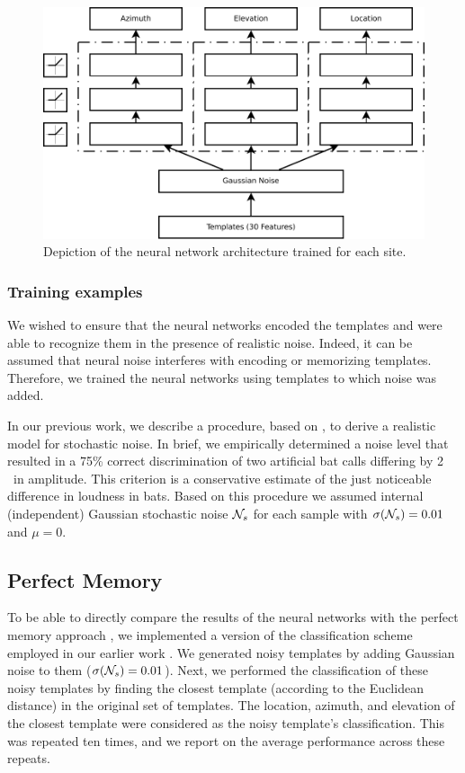 \documentclass[preprint,5p]{elsarticle}
\begin{document}
\begin{figure}
	\centering
	\includegraphics[width=1\linewidth]{figures/networks}
	\caption{Depiction of the neural network architecture trained for each site.}
	\label{fig:networks}
\end{figure}

\subsubsection{Training examples}

We wished to ensure that the neural networks encoded the templates and were able to recognize them in the presence of realistic noise. Indeed, it can be assumed that neural noise interferes with encoding or memorizing templates. Therefore, we trained the neural networks using templates to which noise was added.

In our previous work, we describe a procedure, based on \citet{Dau1996}, to derive a realistic model for stochastic noise. In brief, we empirically determined a noise level that resulted in a 75\% correct discrimination of two artificial bat calls differing by 2 \db\ in amplitude. This criterion is a conservative estimate of the just noticeable difference in loudness in bats. Based on this procedure we assumed internal (independent) Gaussian stochastic noise $\mathcal{N}_s$ for each sample with $\sigma(\mathcal{N}_s) = 0.01$ and $\mu=0$.

\subsection{Perfect Memory}

To be able to directly compare the results of the neural networks with the perfect memory approach \citep{Baddeley2012}, we implemented a version of the classification scheme employed in our earlier work \citep{Vanderelst2016}. We generated noisy templates by adding Gaussian noise to them ($\sigma(\mathcal{N}_s) = 0.01$). Next, we performed the classification of these noisy templates by finding the closest template (according to the Euclidean distance) in the original set of templates. The location, azimuth, and elevation of the closest template were considered as the noisy template's classification. This was repeated ten times, and we report on the average performance across these repeats.
\end{document}
